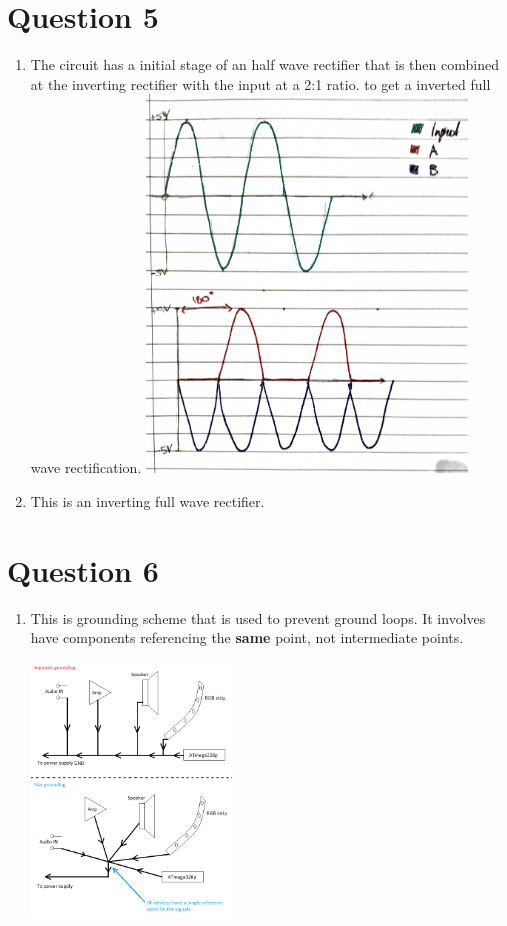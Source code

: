 \documentclass[11pt]{article}
\begin{document}
\begin{preview}
\section*{Question 5}
\begin{enumerate}[label=\roman*)]
        \item The circuit has a initial stage of an half wave rectifier that is then combined at the inverting rectifier with the input at a 2:1 ratio. to get a inverted full wave rectification.
        \includegraphics[width=0.67\textwidth]{5.pdf}
        
        \item This is an inverting full wave rectifier.
\end{enumerate}
\section*{Question 6}
\begin{enumerate}[label=\roman*)]
        \item This is grounding scheme that is used to prevent ground loops. It involves have components referencing the \textbf{same} point, not intermediate points.

        {\centering\includegraphics[width=0.42\textwidth]{star.png}\\}


\end{enumerate}
\end{preview}
\end{document}
